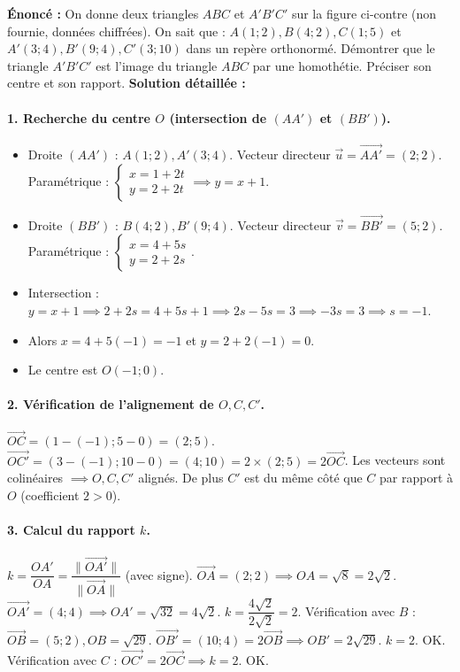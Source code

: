 \documentclass[11pt]{article}
\begin{document}
\begin{exoresolu}
\textbf{Énoncé :} On donne deux triangles $ABC$ et $A'B'C'$ sur la figure ci-contre (non fournie, données chiffrées).
On sait que : $A(1;2), B(4;2), C(1;5)$ et $A'(3;4), B'(9;4), C'(3;10)$ dans un repère orthonormé.
Démontrer que le triangle $A'B'C'$ est l'image du triangle $ABC$ par une homothétie. Préciser son centre et son rapport.
\tcblower
\textbf{Solution détaillée :}
\paragraph{1. Recherche du centre $O$ (intersection de $(AA')$ et $(BB')$).}
\begin{itemize}
    \item Droite $(AA')$ : $A(1;2), A'(3;4)$. Vecteur directeur $\vec{u} = \overrightarrow{AA'} = (2;2)$. Paramétrique : $\begin{cases} x = 1 + 2t \\ y = 2 + 2t \end{cases} \implies y = x + 1$.
    \item Droite $(BB')$ : $B(4;2), B'(9;4)$. Vecteur directeur $\vec{v} = \overrightarrow{BB'} = (5;2)$. Paramétrique : $\begin{cases} x = 4 + 5s \\ y = 2 + 2s \end{cases}$.
    \item Intersection : $y = x+1 \implies 2+2s = 4+5s+1 \implies 2s - 5s = 3 \implies -3s = 3 \implies s = -1$.
    \item Alors $x = 4 + 5(-1) = -1$ et $y = 2 + 2(-1) = 0$.
    \item Le centre est $O(-1;0)$.
\end{itemize}
\paragraph{2. Vérification de l'alignement de $O, C, C'$.}
$\overrightarrow{OC} = (1-(-1); 5-0) = (2;5)$.
$\overrightarrow{OC'} = (3-(-1); 10-0) = (4;10) = 2 \times (2;5) = 2\overrightarrow{OC}$.
Les vecteurs sont colinéaires $\implies O, C, C'$ alignés. De plus $C'$ est du même côté que $C$ par rapport à $O$ (coefficient $2 > 0$).

\paragraph{3. Calcul du rapport $k$.}
$k = \dfrac{OA'}{OA} = \dfrac{\|\overrightarrow{OA'}\|}{\|\overrightarrow{OA}\|}$ (avec signe).
$\overrightarrow{OA} = (2;2) \implies OA = \sqrt{8} = 2\sqrt{2}$.
$\overrightarrow{OA'} = (4;4) \implies OA' = \sqrt{32} = 4\sqrt{2}$.
$k = \dfrac{4\sqrt{2}}{2\sqrt{2}} = 2$.
Vérification avec $B$ : $\overrightarrow{OB} = (5;2), OB = \sqrt{29}$. $\overrightarrow{OB'} = (10;4) = 2\overrightarrow{OB} \implies OB' = 2\sqrt{29}$. $k=2$. OK.
Vérification avec $C$ : $\overrightarrow{OC'} = 2\overrightarrow{OC} \implies k=2$. OK.


\end{exoresolu}
\end{document}
